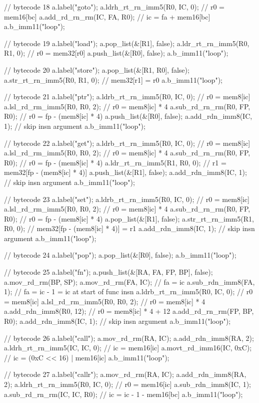 {  // bytecode 18
  a.label("goto");
  a.ldrh_rt_rn_imm5(R0, IC, 0); // r0 = mem16[bc]
  a.add_rd_rn_rm(IC, FA, R0); // ic = fa + mem16[bc]
  a.b_imm11("loop");

  // bytecode 19
  a.label("load");
  a.pop_list(&[R1], false);
  a.ldr_rt_rn_imm5(R0, R1, 0); // r0 = mem32[r0]
  a.push_list(&[R0], false);
  a.b_imm11("loop");

  // bytecode 20
  a.label("store");
  a.pop_list(&[R1, R0], false);
  a.str_rt_rn_imm5(R0, R1, 0); // mem32[r1] = r0
  a.b_imm11("loop");

  // bytecode 21
  a.label("ptr");
  a.ldrb_rt_rn_imm5(R0, IC, 0); // r0 = mem8[ic]
  a.lsl_rd_rm_imm5(R0, R0, 2); // r0 = mem8[ic] * 4
  a.sub_rd_rn_rm(R0, FP, R0); // r0 = fp - (mem8[ic] * 4)
  a.push_list(&[R0], false);
  a.add_rdn_imm8(IC, 1); // skip insn argument
  a.b_imm11("loop");

  // bytecode 22
  a.label("get");
  a.ldrb_rt_rn_imm5(R0, IC, 0); // r0 = mem8[ic]
  a.lsl_rd_rm_imm5(R0, R0, 2); // r0 = mem8[ic] * 4
  a.sub_rd_rn_rm(R0, FP, R0); // r0 = fp - (mem8[ic] * 4)
  a.ldr_rt_rn_imm5(R1, R0, 0); // r1 = mem32[fp - (mem8[ic] * 4)]
  a.push_list(&[R1], false);
  a.add_rdn_imm8(IC, 1); // skip insn argument
  a.b_imm11("loop");

  // bytecode 23
  a.label("set");
  a.ldrb_rt_rn_imm5(R0, IC, 0); // r0 = mem8[ic]
  a.lsl_rd_rm_imm5(R0, R0, 2); // r0 = mem8[ic] * 4
  a.sub_rd_rn_rm(R0, FP, R0); // r0 = fp - (mem8[ic] * 4)
  a.pop_list(&[R1], false);
  a.str_rt_rn_imm5(R1, R0, 0); // mem32[fp - (mem8[ic] * 4)] = r1
  a.add_rdn_imm8(IC, 1); // skip insn argument
  a.b_imm11("loop");

  // bytecode 24
  a.label("pop");
  a.pop_list(&[R0], false);
  a.b_imm11("loop");

  // bytecode 25
  a.label("fn");
  a.push_list(&[RA, FA, FP, BP], false);
  a.mov_rd_rm(BP, SP);
  a.mov_rd_rm(FA, IC); // fa = ic
  a.sub_rdn_imm8(FA, 1); // fa = ic - 1 = ic at start of func insn
  a.ldrb_rt_rn_imm5(R0, IC, 0); // r0 = mem8[ic]
  a.lsl_rd_rm_imm5(R0, R0, 2); // r0 = mem8[ic] * 4
  a.add_rdn_imm8(R0, 12); // r0 = mem8[ic] * 4 + 12
  a.add_rd_rn_rm(FP, BP, R0);
  a.add_rdn_imm8(IC, 1); // skip insn argument
  a.b_imm11("loop");

  // bytecode 26
  a.label("call");
  a.mov_rd_rm(RA, IC);
  a.add_rdn_imm8(RA, 2);
  a.ldrh_rt_rn_imm5(IC, IC, 0); // ic = mem16[ic]
  a.movt_rd_imm16(IC, 0xC); // ic = (0xC << 16) | mem16[ic]
  a.b_imm11("loop");

  // bytecode 27
  a.label("callr");
  a.mov_rd_rm(RA, IC);
  a.add_rdn_imm8(RA, 2);
  a.ldrh_rt_rn_imm5(R0, IC, 0); // r0 = mem16[ic]
  a.sub_rdn_imm8(IC, 1);
  a.sub_rd_rn_rm(IC, IC, R0); // ic = ic - 1 - mem16[bc]
  a.b_imm11("loop");

}
